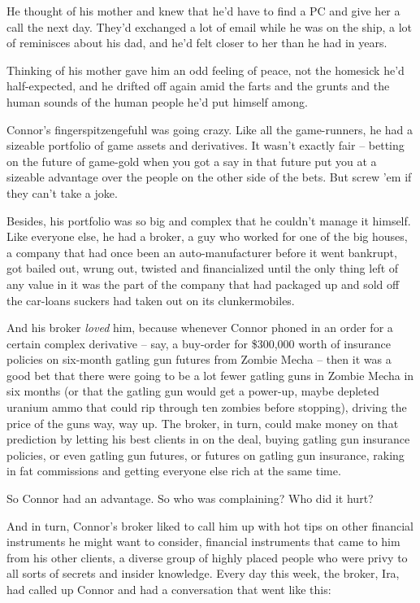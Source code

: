 He thought of his mother and knew that he'd have to find a PC and
give her a call the next day. They'd exchanged a lot of email while
he was on the ship, a lot of reminisces about his dad, and he'd
felt closer to her than he had in years.

Thinking of his mother gave him an odd feeling of peace, not the
homesick he'd half-expected, and he drifted off again amid the
farts and the grunts and the human sounds of the human people he'd
put himself among.

\tb

Connor's fingerspitzengefuhl was going crazy. Like all the
game-runners, he had a sizeable portfolio of game assets and
derivatives. It wasn't exactly fair -- betting on the future of
game-gold when you got a say in that future put you at a sizeable
advantage over the people on the other side of the bets. But screw
'em if they can't take a joke.

Besides, his portfolio was so big and complex that he couldn't
manage it himself. Like everyone else, he had a broker, a guy who
worked for one of the big houses, a company that had once been an
auto-manufacturer before it went bankrupt, got bailed out, wrung
out, twisted and financialized until the only thing left of any
value in it was the part of the company that had packaged up and
sold off the car-loans suckers had taken out on its
clunkermobiles.

And his broker \emph{loved} him, because whenever Connor phoned in
an order for a certain complex derivative -- say, a buy-order for
\$300,000 worth of insurance policies on six-month gatling gun
futures from Zombie Mecha -- then it was a good bet that there were
going to be a lot fewer gatling guns in Zombie Mecha in six months
(or that the gatling gun would get a power-up, maybe depleted
uranium ammo that could rip through ten zombies before stopping),
driving the price of the guns way, way up. The broker, in turn,
could make money on that prediction by letting his best clients in
on the deal, buying gatling gun insurance policies, or even gatling
gun futures, or futures on gatling gun insurance, raking in fat
commissions and getting everyone else rich at the same time.

So Connor had an advantage. So who was complaining? Who did it
hurt?

And in turn, Connor's broker liked to call him up with hot tips on
other financial instruments he might want to consider, financial
instruments that came to him from his other clients, a diverse
group of highly placed people who were privy to all sorts of
secrets and insider knowledge. Every day this week, the broker,
Ira, had called up Connor and had a conversation that went like
this:

